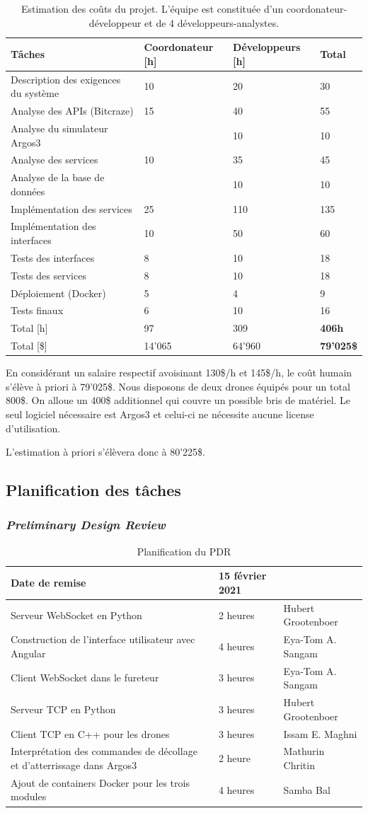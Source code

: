 \documentclass{mistcoursedoc}
\begin{document}
\begin{table}[h!]
  \centering
   \begin{tabular}{M{6.5cm} M{3.5cm} M{3.5cm} M{1.5cm}}
     \hline
      \textbf{Tâches} & \textbf{Coordonateur [h]} & \textbf{Développeurs [h]} & \textbf{Total} \tabularnewline\hline
      Description des exigences du système & 10 & 20 & 30 \tabularnewline
      Analyse des APIs (Bitcraze) & 15 & 40 & 55 \tabularnewline
      Analyse du simulateur Argos3 & & 10 & 10 \tabularnewline
      Analyse des services & 10 & 35 & 45 \tabularnewline
      Analyse de la base de données &  & 10 & 10 \tabularnewline
      Implémentation des services & 25 & 110 & 135 \tabularnewline
      Implémentation des interfaces & 10 & 50 & 60 \tabularnewline
      Tests des interfaces & 8 & 10 & 18 \tabularnewline
      Tests des services & 8 & 10 &  18\tabularnewline
      Déploiement (Docker) & 5 & 4 &  9\tabularnewline
      Tests finaux & 6 & 10 & 16 \tabularnewline\hline
      Total [h] & 97 & 309 & \textbf{406h} \tabularnewline
      Total [\$] & 14'065 & 64'960 & \textbf{79'025\$} \tabularnewline
      \hline
   \end{tabular}
   \caption{Estimation des coûts du projet. L'équipe est constituée d'un coordonateur-développeur et de 4 développeurs-analystes.}
\end{table}

En considérant un salaire respectif avoisinant 130\$/h et 145\$/h, le coût humain s’élève à priori à 79'025\$. 
Nous disposons de deux drones équipés pour un total 800\$. 
On alloue un 400\$ additionnel qui couvre un possible bris de matériel. 
Le seul logiciel nécessaire est Argos3 et celui-ci ne nécessite aucune license d’utilisation.

L’estimation à priori s’élèvera donc à 80'225\$.

\newpage
\subsection{Planification des tâches}

\subsubsection{\emph{Preliminary Design Review}}
\begin{table}[h!]
  \centering
  \begin{tabular}{ M{7cm}M{3cm}M{3.5cm} }
    \hline
    Date de remise & 15 février 2021 & \tabularnewline\hline
    Serveur WebSocket en Python & 2 heures & Hubert Grootenboer\tabularnewline
    Construction de l’interface utilisateur avec Angular & 4 heures & Eya-Tom A. Sangam \tabularnewline
    Client WebSocket dans le fureteur & 3 heures & Eya-Tom A. Sangam\tabularnewline
    Serveur TCP en Python & 3 heures & Hubert Grootenboer\tabularnewline
    Client TCP en C++ pour les drones & 3 heures & Issam E. Maghni\tabularnewline
    Interprétation des commandes de décollage et d’atterrissage dans Argos3 & 2 heure & Mathurin Chritin\tabularnewline
    Ajout de containers Docker pour les trois modules & 4 heures & Samba Bal\tabularnewline
    \hline
  \end{tabular}
  \caption{Planification du PDR}
\end{table}
\end{document}
